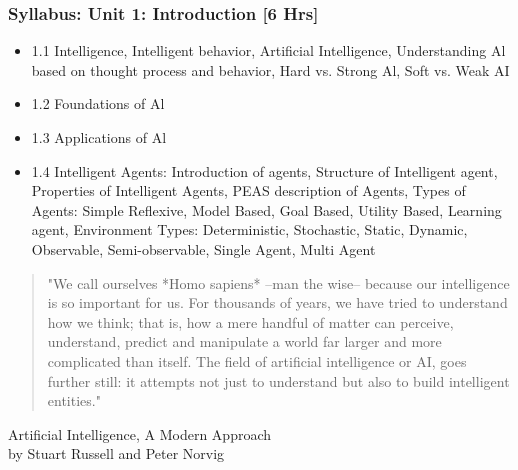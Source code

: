 \documentclass{beamer}
\begin{document}
\begin{frame}
  \frametitle{Syllabus: Unit 1: Introduction [6 Hrs]}
  \begin{itemize}
    \item 1.1 Intelligence, Intelligent behavior, Artificial Intelligence, Understanding Al based on thought process and behavior, Hard vs. Strong Al, Soft vs. Weak AI
    \item 1.2 Foundations of Al
    \item 1.3 Applications of Al
    \item 1.4 Intelligent Agents: Introduction of agents, Structure of Intelligent agent, Properties of Intelligent Agents, PEAS description of Agents, Types of Agents: Simple Reflexive, Model Based, Goal Based, Utility Based, Learning agent, Environment Types: Deterministic, Stochastic, Static, Dynamic, Observable, Semi-observable, Single Agent, Multi Agent
  \end{itemize}
\end{frame}

\begin{frame}
  \begin{quote}
    "We call ourselves *Homo sapiens* --man the wise-- because our intelligence is so important for us. For thousands of years, we have tried to understand how we think; that is, how a mere handful of matter can perceive, understand, predict and manipulate a world far larger and more complicated than itself. The field of artificial intelligence or AI, goes further still: it attempts not just to understand but also to build intelligent entities." 
  \end{quote}
  \raggedleft
    Artificial Intelligence, A Modern Approach \\
    by Stuart Russell and Peter Norvig    

\end{frame}
\end{document}
